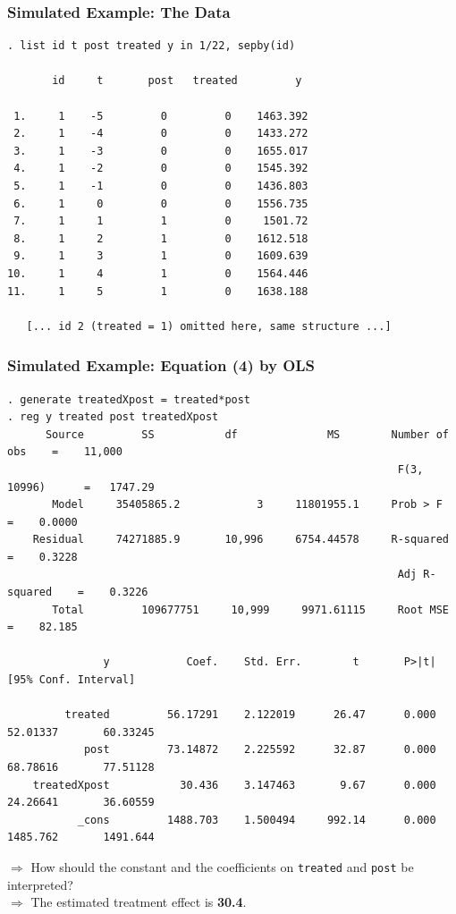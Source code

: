 \documentclass[11pt,aspectratio=169]{beamer}
\begin{document}
\begin{frame}[fragile]
  \frametitle{Simulated Example: The Data}
{\tiny
\begin{verbatim}
. list id t post treated y in 1/22, sepby(id)

       id     t       post   treated         y

 1.     1    -5         0         0    1463.392
 2.     1    -4         0         0    1433.272
 3.     1    -3         0         0    1655.017
 4.     1    -2         0         0    1545.392
 5.     1    -1         0         0    1436.803
 6.     1     0         0         0    1556.735
 7.     1     1         1         0     1501.72
 8.     1     2         1         0    1612.518
 9.     1     3         1         0    1609.639
10.     1     4         1         0    1564.446
11.     1     5         1         0    1638.188

   [... id 2 (treated = 1) omitted here, same structure ...]
\end{verbatim}
}
\end{frame}

\begin{frame}[fragile]
  \frametitle{Simulated Example: Equation (4) by OLS}
{\scriptsize
\begin{verbatim}
. generate treatedXpost = treated*post
. reg y treated post treatedXpost
      Source         SS           df              MS        Number of obs    =    11,000
                                                             F(3, 10996)      =   1747.29
       Model     35405865.2            3     11801955.1     Prob > F         =    0.0000
    Residual     74271885.9       10,996     6754.44578     R-squared        =    0.3228
                                                             Adj R-squared    =    0.3226
       Total         109677751     10,999     9971.61115     Root MSE        =    82.185

               y            Coef.    Std. Err.        t       P>|t|       [95% Conf. Interval]

         treated         56.17291    2.122019      26.47      0.000       52.01337       60.33245
            post         73.14872    2.225592      32.87      0.000       68.78616       77.51128
    treatedXpost           30.436    3.147463       9.67      0.000       24.26641       36.60559
           _cons         1488.703    1.500494     992.14      0.000       1485.762       1491.644
\end{verbatim}
}
\vspace{0.3em}
$\Rightarrow$ How should the constant and the coefficients on \texttt{treated} and \texttt{post} be interpreted?\\
$\Rightarrow$ The estimated treatment effect is \textbf{30.4}.
\end{frame}
\end{document}
